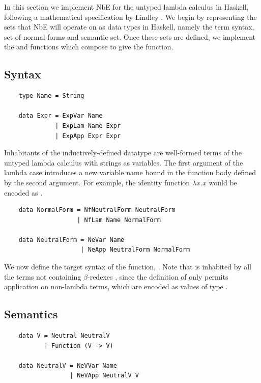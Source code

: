 In this section we implement NbE for the untyped lambda calculus in Haskell, following a mathematical specification by Lindley \cite{slides}. We begin by representing the sets that NbE will operate on as data types in Haskell, namely the term syntax, set of normal forms and semantic set. Once these sets are defined, we implement the  and  functions which compose to give the  function.

\subsection{Syntax}

\begin{lstlisting}
    type Name = String

    data Expr = ExpVar Name
              | ExpLam Name Expr
              | ExpApp Expr Expr
\end{lstlisting}

Inhabitants of the inductively-defined datatype  are well-formed terms of the untyped lambda calculus with strings as variables. The first argument of the lambda case introduces a new variable name bound in the function body defined by the second argument. For example, the identity function $\lambda x . x$ would be encoded as .

\begin{lstlisting}
    data NormalForm = NfNeutralForm NeutralForm
                    | NfLam Name NormalForm

    data NeutralForm = NeVar Name
                     | NeApp NeutralForm NormalForm
\end{lstlisting}

We now define the target syntax of the  function, . Note that  is inhabited by all the terms not containing $\beta$-redexes \cite{slides}, since the definition of  only permits application on non-lambda terms, which are encoded as values of type .

\vspace{\baselineskip}

\subsection{Semantics}

\begin{lstlisting}
    data V = Neutral NeutralV
           | Function (V -> V)

    data NeutralV = NeVVar Name
                  | NeVApp NeutralV V
\end{lstlisting}

